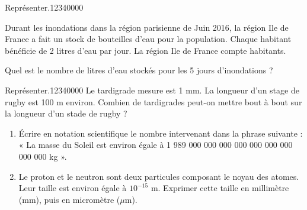 \begin{pageAD}
\begin{ExoCad}{Représenter.}{1234}{0}{0}{0}{0}

Durant les inondations dans la région parisienne de Juin 2016, la région Ile de France a fait un stock de bouteilles d'eau pour la population. Chaque habitant bénéficie de 2 litres d'eau par jour. La région Ile de France compte  habitants.

Quel est le nombre de litres d'eau stockés pour les 5 jours d'inondations ?
\end{ExoCad}

\begin{ExoCad}{Représenter.}{1234}{0}{0}{0}{0}
Le tardigrade mesure est 1 mm. La longueur d'un stage de rugby est 100 m environ. Combien de tardigrades peut-on mettre bout à bout sur la longueur d'un stade de rugby ?
\end{ExoCad}




\begin{enumerate}
\item Écrire en notation scientifique le nombre intervenant dans la phrase suivante :
« La masse du Soleil est environ égale à 1 989 000 000 000 000 000 000 000 000 000 kg ».

\item Le proton et le neutron sont deux particules composant le noyau des atomes. Leur taille est environ égale à $10^{-15}$ m. Exprimer cette taille en millimètre (mm), puis en micromètre ($\mu$m).
\end{enumerate}




\end{pageAD}  

